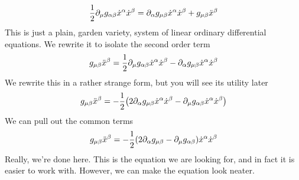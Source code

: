 	\[
		\frac{1}{2} 
		\partial_\mu g_{\alpha\beta}
		\dot{x}^\alpha
		\dot{x}^\beta
		=
		\partial_\alpha{g_{\mu\beta}}\dot{x}^\alpha \dot{x}^\beta 
		+ 
		g_{\mu\beta}\ddot{x}^\beta
	\]
	This is just a plain, garden variety, system of linear ordinary differential equations.
	We rewrite it to isolate the second order term
	\[
		g_{\mu\beta}\ddot{x}^\beta
		=
		\frac{1}{2} 
		\partial_\mu g_{\alpha\beta}
		\dot{x}^\alpha
		\dot{x}^\beta
		-
		\partial_\alpha{g_{\mu\beta}}\dot{x}^\alpha \dot{x}^\beta 
	\]
	We rewrite this in a rather strange form, but you will see its utility later
	\[
		g_{\mu\beta}\ddot{x}^\beta
		=
		-
		\frac{1}{2} 
		\pqty{
			2
			\p_\alpha{g_{\mu\beta}}
			\dot{x}^\alpha 
			\dot{x}^\beta 
			-
			\p_\mu g_{\alpha\beta}
			\dot{x}^\alpha
			\dot{x}^\beta
		}
	\]
	We can pull out the common terms
	\[
		g_{\mu\beta}\ddot{x}^\beta
		=
		-
		\frac{1}{2} 
		\pqty{
			2
			\p_\alpha{g_{\mu\beta}}
			-
			\p_\mu g_{\alpha\beta}
		}
		\dot{x}^\alpha 
		\dot{x}^\beta 
	\]
	Really, we're done here. This is the equation we are looking for, and in fact it is easier to work with.
	However, we can make the equation look neater.

